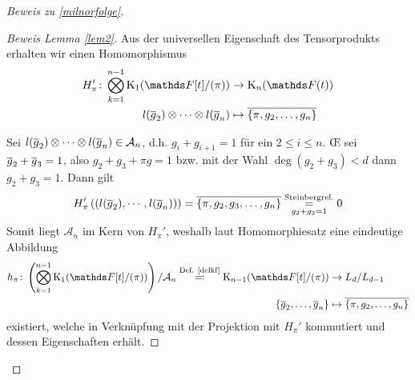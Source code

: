 \documentclass[ngerman,fontsize=11pt, paper=a4, parskip=half, titlepage=true, toc=bib]{scrartcl}
\begin{document}
\begin{proof}[Beweis zu \ref{milnorfolge}]
\begin{proof}[Beweis Lemma \ref{lem2}]
    Aus der universellen Eigenschaft des Tensorprodukts erhalten wir
    einen Homomorphismus
    \begin{align*}
      H_\pi'\colon\bigotimes_{k=1}^{n-1}\K_1(\Ftpi)
      &\to\KnFt\\
      l(\ov g_2)\otimes\dotsb\otimes l(\ov g_n)
      &\mapsto \ov{\{\pi,g_2,\dotsc,g_n\}}
    \end{align*}
    
    Sei $l(\overline g_2)\otimes\dotsb\otimes l(\overline g_n)\in\mathcal{A}_n$,
    d.h. $g_i+g_{i+1}=1$ für ein $2\leq i\leq n$.
    \OE{} sei $\overline g_2 + \overline g_3=1$, 
    also $g_2 + g_3 +\pi g=1$ bzw. mit der Wahl
    $\deg(g_2+g_3)<d$ dann $g_2+g_3=1$. Dann gilt
    \begin{gather*}
      H'_\pi\left(\left(l(\overline g_2),\dotsb,l(\overline g_n)\right)\right)
      = \overline{\{\pi,g_2,g_3, \dotsc,g_n\}}
      \overset{\text{Steinbergrel.}}{\underset{g_2+g_3=1}{=}} 0
    \end{gather*}
    Somit liegt $\mathcal{A}_n$ im Kern von $H_\pi'$, weshalb laut
    Homomorphiesatz eine eindeutige Abbildung
    \begin{align*}
      h_\pi\colon 
      \left(\bigotimes_{k=1}^{n-1}\K_1(\Ftpi)\right)/\mathcal{A}_n
      \overset{\text{Def. \ref{defkf}}}{\eqqcolon}
      \K_{n-1}(\Ftpi)&\to L_d/L_{d-1}\\
      \{\ov g_2,\dotsc,\ov g_n\}&\mapsto \ov{\{\pi,g_2,\dotsc,g_n\}}
    \end{align*}
    existiert, welche in Verknüpfung mit der Projektion mit 
    $H_\pi'$ kommutiert und dessen Eigenschaften erhält.

    

\end{proof}
\end{proof}
\end{document}
